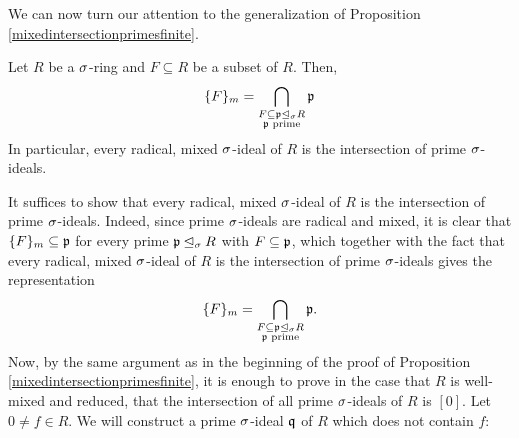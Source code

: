 We can now turn our attention to the generalization of Proposition \ref{mixedintersectionprimesfinite}. 


\begin{theorem}\label{intersectionprimes}
Let $R$ be a $\sigma$-ring and $F \subseteq R$ be a subset of $R$. Then, 
\begin{align*} \{F\}_m = \bigcap_{\substack{F \subseteq \mathfrak{p} \unlhd_{\sigma} R \\ \mathfrak{p} \text{ prime}}} \mathfrak{p} \end{align*}
In particular, every radical, mixed $\sigma$-ideal of $R$ is the intersection of prime $\sigma$-ideals.
\begin{bew}
It suffices to show that every radical, mixed $\sigma$-ideal of $R$ is the intersection of prime $\sigma$-ideals.
Indeed, since prime $\sigma$-ideals are radical and mixed, it is clear that $\{F\}_m \subseteq \mathfrak{p}$ for every prime $\mathfrak{p} \unlhd_{\sigma} R$ with $F \subseteq \mathfrak{p}$, which together with the fact that every radical, mixed $\sigma$-ideal of $R$ is the intersection of prime $\sigma$-ideals gives the representation 
\begin{align*} \{F\}_m = \bigcap_{\substack{F \subseteq \mathfrak{p} \unlhd_{\sigma} R \\ \mathfrak{p} \text{ prime}}} \mathfrak{p}. \end{align*}
Now, by the same argument as in the beginning of the proof of Proposition \ref{mixedintersectionprimesfinite}, it is enough to prove in the case that $R$ is well-mixed and reduced, that the intersection of all prime $\sigma$-ideals of $R$ is $[0]$.
Let $0 \neq f \in R$. We will construct a prime $\sigma$-ideal $\mathfrak{q}$ of $R$ which does not contain $f$: 


\end{bew}
\end{theorem}

